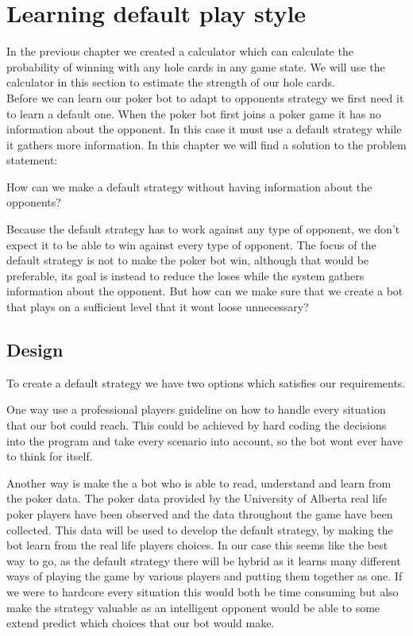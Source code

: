 \section{Learning default play style}
\label{sec:part2}
In the previous chapter we created a calculator which can calculate the probability of winning with any hole cards in any game state. We will use the calculator in this section to estimate the strength of our hole cards.\\

Before we can learn our poker bot to adapt to opponents strategy we first need it to learn a default one. When the poker bot first joins a poker game it has no information about the opponent. In this case it must use a default strategy while it gathers more information.
In this chapter we will find a solution to the problem statement:

\vspace{4mm}
\begin{statementBox}
How can we make a default strategy without having information about the opponents?
\end{statementBox}
\vspace{4mm}

Because the default strategy has to work against any type of opponent, we don't expect it to be able to win against every type of opponent. The focus of the default strategy is not to make the poker bot win, although that would be preferable, its goal is instead to reduce the loses while the system gathers information about the opponent. But how can we make sure that we create a bot that plays on a sufficient level that it wont loose unnecessary?


\subsection{Design}
To create a default strategy we have two options which satisfies our requirements.

One way use a professional players guideline on how to handle every situation that our bot could reach. This could be achieved by hard coding the decisions into the program and take every scenario into account, so the bot wont ever have to think for itself.

Another way is make the a bot who is able to read, understand and learn from the poker data.
The poker data provided by the University of Alberta real life poker players have been observed and the data throughout the game have been collected. 
This data will be used to develop the default strategy, by making the bot learn from the real life players choices.
In our case this seems like the best way to go, as the default strategy there will be hybrid as it learns many different ways of 
playing the game by various players and putting them together as one. 
If we were to hardcore every situation this would both be time consuming but also make the strategy valuable as an intelligent opponent
would be able to some extend predict which choices that our bot would make. 


